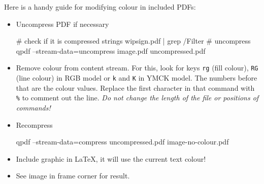 \documentclass[mathserif, fleqn]{beamer}
\begin{document}
\begin{frame}
  \scriptsize
  Here is a handy guide for modifying colour in included PDFs:
  \begin{itemize}
  \item Uncompress PDF if necessary
    \begin{shell}[]
# check if it is compressed
strings wipsign.pdf | grep /Filter
# uncompress
qpdf --stream-data=uncompress image.pdf uncompressed.pdf
    \end{shell}
  \item Remove colour from content stream. For this, look for keys \verb$rg$ (fill colour), \verb$RG$ (line colour) in RGB model or \verb$k$ and \verb$K$ in YMCK model. The numbers before that are the colour values.
    Replace the first character in that command with \verb$%$ to comment out the line. \emph{Do not change the length of the file or positions of commands!}
  \item Recompress
    \begin{shell}[]
qpdf --stream-data=compress uncompressed.pdf image-no-colour.pdf
    \end{shell}
  \item Include graphic in \LaTeX, it will use the current text colour!
  \item See image in frame corner for result.
  \end{itemize}
\end{frame}
\end{document}
